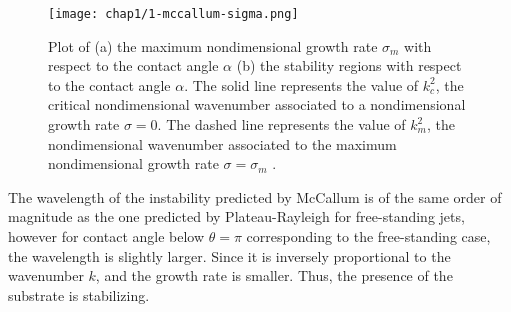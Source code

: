         \begin{figure}[H]
                \centering
                \texttt{[image: chap1/1-mccallum-sigma.png]}
                \caption{Plot of (a) the maximum nondimensional growth rate $\sigma_m$ with respect to the contact angle $\alpha$ (b) the stability regions with respect to the contact angle $\alpha$. The solid line represents the value of $k_c^2$, the critical nondimensional wavenumber associated to a nondimensional growth rate $\sigma=0$. The dashed line represents the value of $k_m^2$, the nondimensional wavenumber associated to the maximum nondimensional growth rate $\sigma = \sigma_m$ \cite{McCallumVoorheesMiksisDavisWong1996}.}
                \label{fig:sigma_m_mccallum}
        \end{figure}
        The wavelength of the instability predicted by McCallum is of the same order of magnitude as the one predicted by Plateau-Rayleigh for free-standing jets, however for contact angle below $\theta=\pi$ corresponding to the free-standing case, the wavelength is slightly larger. Since it is inversely proportional to the wavenumber $k$, and the growth rate is smaller. Thus, the presence of the substrate is stabilizing.
